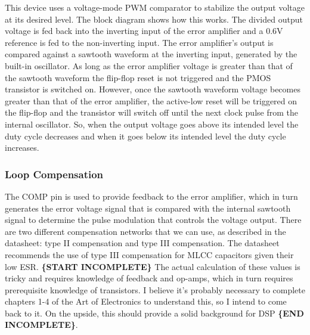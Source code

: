 This device uses a voltage-mode PWM comparator to stabilize the output voltage at its desired
level. The block diagram shows how this works. The divided output voltage is fed back into the
inverting input of the error amplifier and a 0.6V reference is fed to the non-inverting input. The
error amplifier's output is compared against a sawtooth waveform at the inverting input, generated
by the built-in oscillator. As long as the error amplifier voltage is greater than that of the
sawtooth waveform the flip-flop reset is not triggered and the PMOS transistor is switched
on. However, once the sawtooth waveform voltage becomes greater than that of the error amplifier,
the active-low reset will be triggered on the flip-flop and the transistor will switch off until the
next clock pulse from the internal oscillator. So, when the output voltage goes above its intended
level the duty cycle decreases and when it goes below its intended level the duty cycle increases.

\subsubsection{Loop Compensation}
\label{sec:l7980-loop-compensation}

The COMP pin is used to provide feedback to the error amplifier, which in turn generates the error
voltage signal that is compared with the internal sawtooth signal to determine the pulse modulation
that controls the voltage output. There are two different compensation networks that we can use, as
described in the datasheet: type II compensation and type III compensation. The datasheet recommends
the use of type III compensation for MLCC capacitors given their low ESR. \textbf{\{START
  INCOMPLETE\}} The actual calculation of these values is tricky and requires knowledge of feedback
and op-amps, which in turn requires prerequisite knowledge of transistors. I believe it's probably
necessary to complete chapters 1-4 of the Art of Electronics to understand this, so I intend to come
back to it. On the upside, this should provide a solid background for DSP \textbf{\{END
  INCOMPLETE\}}.

